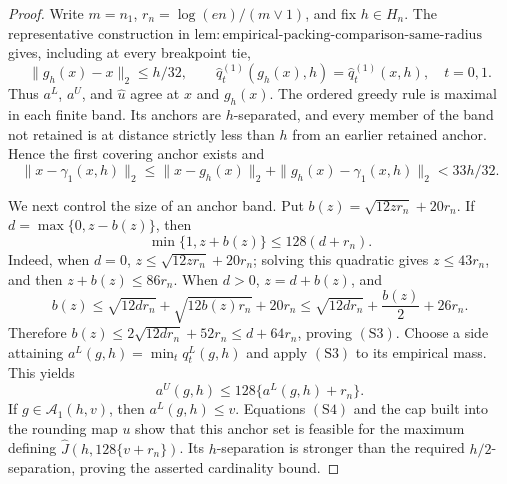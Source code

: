 \documentclass{article}
\begin{document}
\begin{proof}
Write \(m=n_1\), \(r_n=\log(en)/(m\vee1)\), and fix \(h\in H_n\).
The representative construction in
\(\mathrm{lem{:}empirical\text{-}packing\text{-}comparison\text{-}same\text{-}radius}\)
gives, including at every breakpoint tie,
\[
 \|g_h(x)-x\|_2\leq h/32,\qquad
 \widehat q^{(1)}_t(g_h(x),h)=\widehat q^{(1)}_t(x,h),
 \quad t=0,1.                                                     \tag{S1}
\]
Thus \(a^L\), \(a^U\), and \(\widehat u\) agree at \(x\) and \(g_h(x)\).
The ordered greedy rule is maximal in each finite band.  Its anchors are
\(h\)-separated, and every member of the band not retained is at distance
strictly less than \(h\) from an earlier retained anchor.  Hence the first
covering anchor exists and
\[
 \|x-\gamma_1(x,h)\|_2
 \leq\|x-g_h(x)\|_2+\|g_h(x)-\gamma_1(x,h)\|_2
 <33h/32.                                                        \tag{S2}
\]

We next control the size of an anchor band.  Put
\(b(z)=\sqrt{12zr_n}+20r_n\).  If
\(d=\max\{0,z-b(z)\}\), then
\[
 \min\{1,z+b(z)\}\leq128(d+r_n).                                 \tag{S3}
\]
Indeed, when \(d=0\), \(z\leq\sqrt{12zr_n}+20r_n\); solving this quadratic
gives \(z\leq43r_n\), and then \(z+b(z)\leq86r_n\).
When \(d>0\), \(z=d+b(z)\), and
\[
 b(z)\leq\sqrt{12dr_n}+\sqrt{12b(z)r_n}+20r_n
 \leq\sqrt{12dr_n}+\frac{b(z)}2+26r_n.
\]
Therefore \(b(z)\leq2\sqrt{12dr_n}+52r_n\leq d+64r_n\), proving
\((\mathrm{S3})\).  Choose a side attaining
\(a^L(g,h)=\min_tq^L_t(g,h)\) and apply \((\mathrm{S3})\) to its empirical
mass.  This yields
\[
 a^U(g,h)\leq128\{a^L(g,h)+r_n\}.                                \tag{S4}
\]
If \(g\in\mathcal A_1(h,v)\), then \(a^L(g,h)\leq v\).
Equations \((\mathrm{S4})\) and the cap built into the rounding map \(u\)
show that this anchor set is feasible for the maximum defining
\(\widehat J(h,128\{v+r_n\})\).  Its \(h\)-separation is stronger than the
required \(h/2\)-separation, proving the asserted cardinality bound.


\end{proof}
\end{document}
